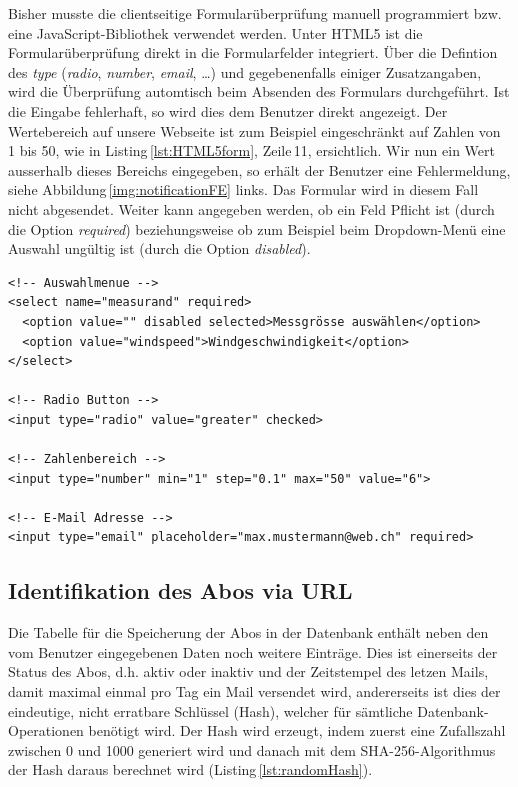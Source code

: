 \noindent
Bisher musste die clientseitige Formularüberprüfung manuell programmiert bzw. eine JavaScript-Bibliothek verwendet werden. Unter HTML5 ist die Formularüberprüfung direkt in die Formularfelder integriert. Über die Defintion des \emph{type} (\emph{radio}, \emph{number}, \emph{email}, \dots) und gegebenenfalls einiger Zusatzangaben, wird die Überprüfung automtisch beim Absenden des Formulars durchgeführt. Ist die Eingabe fehlerhaft, so wird dies dem Benutzer direkt angezeigt. Der Wertebereich auf unsere Webseite ist zum Beispiel eingeschränkt auf Zahlen von 1 bis 50, wie in Listing\,\ref{lst:HTML5form}, Zeile\,11, ersichtlich. Wir nun ein Wert ausserhalb dieses Bereichs eingegeben, so erhält der Benutzer eine Fehlermeldung, siehe Abbildung\,\ref{img:notificationFE} links. Das Formular wird in diesem Fall nicht abgesendet. Weiter kann angegeben werden, ob ein Feld Pflicht ist (durch die Option \emph{required}) beziehungsweise ob zum Beispiel beim Dropdown-Menü eine Auswahl ungültig ist (durch die Option \emph{disabled}).

\vspace{3mm}
\begin{lstlisting}[label=lst:HTML5form,caption=Integrierte Formularüberprüfung mit HTML5, language=HTML5, style=htmlcssjs]
<!-- Auswahlmenue -->
<select name="measurand" required>
  <option value="" disabled selected>Messgrösse auswählen</option>
  <option value="windspeed">Windgeschwindigkeit</option>
</select>

<!-- Radio Button -->
<input type="radio" value="greater" checked>

<!-- Zahlenbereich -->
<input type="number" min="1" step="0.1" max="50" value="6">

<!-- E-Mail Adresse -->
<input type="email" placeholder="max.mustermann@web.ch" required>
\end{lstlisting}
\vspace{3mm}

\subsection{Identifikation des Abos via URL}
Die Tabelle für die Speicherung der Abos in der Datenbank enthält neben den vom Benutzer eingegebenen Daten noch weitere Einträge. Dies ist einerseits der Status des Abos, d.h. aktiv oder inaktiv und der Zeitstempel des letzen Mails, damit maximal einmal pro Tag ein Mail versendet wird, andererseits ist dies der eindeutige, nicht erratbare Schlüssel (Hash), welcher für sämtliche Datenbank-Operationen benötigt wird. Der Hash wird erzeugt, indem zuerst eine Zufallszahl zwischen 0 und 1000 generiert wird und danach mit dem SHA-256-Algorithmus der Hash daraus berechnet wird (Listing\,\ref{lst:randomHash}).

